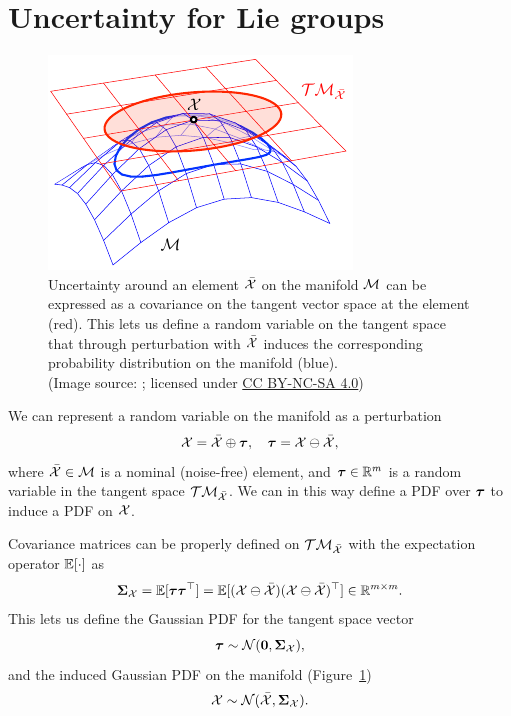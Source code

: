 \section{Uncertainty for Lie groups}
\begin{figure}[htb]
    \centering
    \includegraphics[width=0.6\columnwidth]{figures/covariance.pdf}
    \caption{Uncertainty around an element $\bar{\mathcal{X}}$ on the manifold $\mathcal{M}$ can be expressed as a covariance on the tangent vector space at the element (red).
    This lets us define a random variable on the tangent space that through perturbation with $\bar{\mathcal{X}}$ induces the corresponding probability distribution on the manifold (blue).\\
    (Image source: \cite{SolaARobotics}; licensed under \href{https://creativecommons.org/licenses/by-nc-sa/4.0/}{CC BY-NC-SA 4.0})}
    \label{fig:uncertainty-on-manifold}
\end{figure}

We can represent a random variable on the manifold as a perturbation
\begin{equation}
  \mathcal{X} = \bar{\mathcal{X}} \oplus {\boldsymbol{\mathbf{\tau}}}, \quad {\boldsymbol{\mathbf{\tau}}} = \mathcal{X} \ominus \bar{\mathcal{X}},
\end{equation}
where $\bar{\mathcal{X}} \in \mathcal{M}$ is a nominal (noise-free) element, and ${\boldsymbol{\mathbf{\tau}}} \in {\mathbb R}^m$ is a random variable in the tangent space $\mathcal{T}\mathcal{M}_{\bar{\mathcal{X}}}$.
We can in this way define a PDF over ${\boldsymbol{\mathbf{\tau}}}$ to induce a PDF on $\mathcal{X}$.

Covariance matrices can be properly defined on $\mathcal{T}\mathcal{M}_{\bar{\mathcal{X}}}$ with the expectation operator ${\mathbb E}[\cdot]$ as
\begin{equation}
  {\boldsymbol{\mathbf{\Sigma}}}_{\mathcal{X}} = {\mathbb E}[{\boldsymbol{\mathbf{\tau}}} {\boldsymbol{\mathbf{\tau}}}^{\top}] = {\mathbb E}[(\mathcal{X} \ominus \bar{\mathcal{X}}) (\mathcal{X} \ominus \bar{\mathcal{X}})^{\top}] \in {\mathbb R}^{m \times m}.
\end{equation}
This lets us define the Gaussian PDF for the tangent space vector
\begin{equation}
  {\boldsymbol{\mathbf{\tau}}} \sim \mathcal{N}(\boldsymbol{\mathbf{0}}, {\boldsymbol{\mathbf{\Sigma}}}_{\mathcal{X}}),
\end{equation}
and the induced Gaussian PDF on the manifold (Figure~\ref{fig:uncertainty-on-manifold})
\begin{equation}
  \mathcal{X} \sim \mathcal{N}(\bar{\mathcal{X}}, {\boldsymbol{\mathbf{\Sigma}}}_{\mathcal{X}}).
\end{equation}

